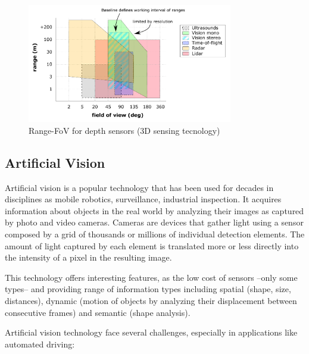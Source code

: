 \begin{figure}[h]
    \centering
    \includegraphics[width=0.8\textwidth]{"img/plot_range-fov"}
    \caption{Range-FoV for depth sensors (3D sensing tecnology)}
    \label{fig:range-fov}
\end{figure}

\subsection{Artificial Vision}
Artificial vision is a popular technology that has been used for decades in 
disciplines as mobile robotics, surveillance, industrial inspection. It acquires
information about objects in the real world by analyzing their images as 
captured by photo and video cameras. Cameras are devices that gather light using
a sensor composed by a grid of thousands or millions of individual detection 
elements. The amount of light captured by each element is translated more or 
less directly into the intensity of a pixel in the resulting image. 

This technology offers interesting features, as the low cost of sensors --only 
some types-- and providing range of information types including spatial
(shape, size, distances), dynamic (motion of objects by analyzing their 
displacement between consecutive frames) and semantic (shape analysis).

Artificial vision technology face several challenges, especially in 
applications like automated driving:

